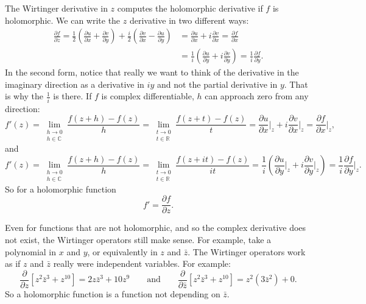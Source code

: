 \documentclass[12pt,openany]{book}
\newcommand{\C}{{\mathbb{C}}}
\newcommand{\R}{{\mathbb{R}}}
\theoremstyle{plain}
\theoremstyle{remark}
\theoremstyle{definition}
\theoremstyle{exercise}
\theoremstyle{example}
\begin{document}
The Wirtinger derivative in $z$ computes the holomorphic derivative
if $f$ is holomorphic.  We can write
the $z$ derivative in two different ways:
\begin{equation*}
\begin{split}
\frac{\partial f}{\partial z} 
=
\frac{1}{2}
\left(
\frac{\partial u}{\partial x} 
+ \frac{\partial v}{\partial y}
\right)
+
\frac{i}{2}
\left( \frac{\partial v}{\partial x} - \frac{\partial u}{\partial y}
\right) 
& =
\frac{\partial u}{\partial x} 
+ i \frac{\partial v}{\partial x}
 =
\frac{\partial f}{\partial x}
\\
& =
\frac{1}{i} \left(
\frac{\partial u}{\partial y}
+ i
\frac{\partial v}{\partial y} 
\right)
 =
\frac{1}{i}
\frac{\partial f}{\partial y}
.
\end{split}
\end{equation*}
In the second form, notice that really we want to think of the derivative in
the imaginary direction as a derivative in $iy$ and not the partial
derivative in $y$.  That is why the $\frac{1}{i}$ is there.
If $f$ is complex differentiable, $h$ can
approach zero from any direction:
\begin{equation*}
f'(z) =
\lim_{\substack{h \to 0\\h\in\C}}
\frac{f(z+h)-f(z)}{h}
=
\lim_{\substack{t \to 0\\t\in\R}}
\frac{f(z+t)-f(z)}{t}
=
\frac{\partial u}{\partial x} \Big|_z
+ i \frac{\partial v}{\partial x}\Big|_z
 =
\frac{\partial f}{\partial x} \Big|_z ,
\end{equation*}
and
\begin{equation*}
f'(z) =
\lim_{\substack{h \to 0\\h\in\C}}
\frac{f(z+h)-f(z)}{h}
=
\lim_{\substack{t \to 0\\t\in\R}}
\frac{f(z+it)-f(z)}{it}
=
\frac{1}{i}
\left(
\frac{\partial u}{\partial y}  \Big|_z
+ i \frac{\partial v}{\partial y} \Big|_z
\right)
 =
\frac{1}{i}
\frac{\partial f}{\partial y} \Big|_z .
\end{equation*}
So for a holomorphic function
\begin{equation*}
f' =
\frac{\partial f}{\partial z} .
\end{equation*}

Even for functions that are not holomorphic, and so the complex derivative
does not exist, the Wirtinger operators still
make sense.  For example, take a polynomial in $x$ and $y$, or equivalently
in $z$ and $\bar{z}$.
The Wirtinger operators
work as if $z$ and $\bar{z}$ really were independent variables.  For example:
\begin{equation*}
\frac{\partial}{\partial z}
\left[ z^2 \bar{z}^3 + z^{10} \right]
=
2z \bar{z}^3 + 10 z^{9}
\qquad
\text{and}
\qquad
\frac{\partial}{\partial \bar{z}}
\left[ z^2 \bar{z}^3 + z^{10} \right]
=
z^2 ( 3 \bar{z}^2 ) + 0 .
\end{equation*}
So a holomorphic function is a function not depending on $\bar{z}$.
\end{document}
